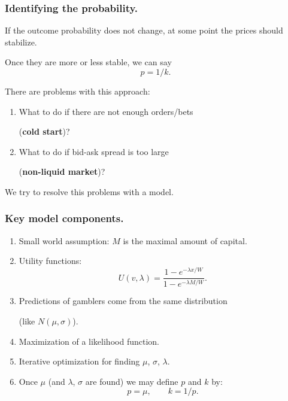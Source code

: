 \documentclass{beamer}
\begin{document}
\begin{frame}[fragile]
\frametitle{Identifying the probability.}
If the outcome probability does not change, at some point the prices should stabilize.

Once they are more or less stable, we can say
$$p = 1/k.$$

There are problems with this approach:
\begin{enumerate}
	\item What to do if there are not enough orders/bets 
	
	(\textbf{cold start})?
	\item What to do if bid-ask spread is too large 
	
	(\textbf{non-liquid market})?
\end{enumerate}

We try to resolve this problems with a model.
\end{frame}
\begin{frame}[fragile]
\frametitle{Key model components.}
\begin{enumerate}
  \item Small world assumption: $M$ is the maximal amount of capital.
	\item Utility functions:
	$$U(v, \lambda) = \frac{1-e^{-\lambda x/W}}{1-e^{-\lambda M/W}}.$$
	\item Predictions of gamblers come from the same distribution
	\
	
	(like $N(\mu, \sigma)$).
	\item Maximization of a likelihood function.
	\item Iterative optimization for finding $\mu$, $\sigma$, $\lambda$.
	\item Once $\mu$ (and $\lambda$, $\sigma$ are found) we may define $p$ and $k$ by:
	$$p=\mu,\qquad k=1/p.$$
\end{enumerate}
\end{frame}
\end{document}
